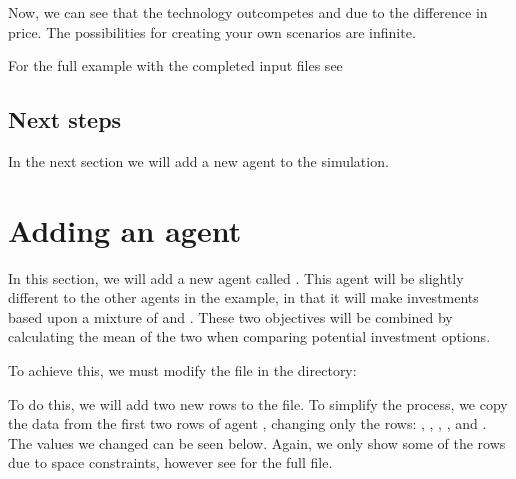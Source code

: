 \documentclass[letterpaper,10pt,english]{sphinxmanual}
\begin{document}
Now, we can see that the technology  outcompetes  and  due to the difference in price. The possibilities for creating your own scenarios are infinite.

For the full example with the completed input files see 


\subsection{Next steps}
\label{\detokenize{user-guide/add-solar:Next-steps}}
In the next section we will add a new agent to the simulation.


\section{Adding an agent}
\label{\detokenize{user-guide/add-agent:Adding-an-agent}}\label{\detokenize{user-guide/add-agent::doc}}
In this section, we will add a new agent called . This agent will be slightly different to the other agents in the  example, in that it will make investments based upon a mixture of  and . These two objectives will be combined by calculating the mean of the two when comparing potential investment options.

To achieve this, we must modify the  file in the directory:

\begin{sphinxVerbatim}[commandchars=\\\{\}]
\end{sphinxVerbatim}

To do this, we will add two new rows to the file. To simplify the process, we copy the data from the first two rows of agent , changing only the rows: , , , ,  and . The values we changed can be seen below. Again, we only show some of the rows due to space constraints, however see  for the full file.
\end{document}
